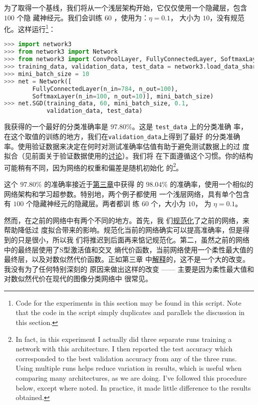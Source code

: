 为了取得一个基线，我们将从一个浅层架构开始，它仅仅使用一个隐藏层，包含 $100$ 个隐
藏神经元。我们会训练 $60$ \epochs{}，使用\learningrate{}为：$\eta =
0.1$，\minibatch{} 大小为 $10$，没有规范化。这样运行\footnote{Code for the
  experiments in this section may be found in this script. Note that the code in
  the script simply duplicates and parallels the discussion in this section.}：
\begin{lstlisting}[language=Python]
>>> import network3
>>> from network3 import Network
>>> from network3 import ConvPoolLayer, FullyConnectedLayer, SoftmaxLayer
>>> training_data, validation_data, test_data = network3.load_data_shared()
>>> mini_batch_size = 10
>>> net = Network([
        FullyConnectedLayer(n_in=784, n_out=100),
        SoftmaxLayer(n_in=100, n_out=10)], mini_batch_size)
>>> net.SGD(training_data, 60, mini_batch_size, 0.1, 
            validation_data, test_data)
\end{lstlisting}

我获得的一个最好的分类准确率是 $97.80$\%。这是 \lstinline!test_data! 上的分类准确
率，在这个取值的训练\epoch{}的地方，我们在\lstinline!validation_data!上得到了最好
的分类准确率。使用验证数据来决定在何时对测试准确率估值有助于避免测试数据上的过
度拟合（见前面关于验证数据使用的\hyperref[validation_explanation]{讨论}）。我们将
在下面遵循这个习惯。你的结构可能稍有不同，因为网络的权重和偏差是随机初始化
的\footnote{In fact, in this experiment I actually did three separate runs
  training a network with this architecture. I then reported the test accuracy
  which corresponded to the best validation accuracy from any of the three
  runs. Using multiple runs helps reduce variation in results, which is useful
  when comparing many architectures, as we are doing. I've followed this
  procedure below, except where noted. In practice, it made little difference to
  the results obtained.}。

这个 $97.80$\% 的准确率接近于\hyperref[chap3_98_04_percent]{第三章}中获得
的 $98.04$\% 的准确率，使用一个相似的网络架构和学习超参数。特别地，两个例子都使用
一个浅层网络，具有单个包含有 $100$ 个隐藏神经元的隐藏层。两者都训
练 $60$ 个\epochs{}，\minibatch{}大小为 $10$，\learningrate{} 为 $\eta = 0.1$。

然而，在之前的网络中有两个不同的地方。首先，我
们\hyperref[sec:overfitting_and_regularization]{规范化}了之前的网络，来帮助降低过
度拟合带来的影响。规范化当前的网络确实可以提高准确率，但是得到的只是很小，所以我
们将推迟到后面再来惦记规范化。第二，虽然之前的网络中的最终层使用了S型激活值和交叉
熵代价函数，当前网络使用一个柔性最大值的最终层，以及对数似然代价函数。正如第三章
中\hyperref[subsec:softmax]{解释}的，这不是一个大的改变。我没有为了任何特别深刻的
原因来做出这样的改变 —— 主要是因为柔性最大值和对数似然代价在现代的图像分类网络中
很常见。

